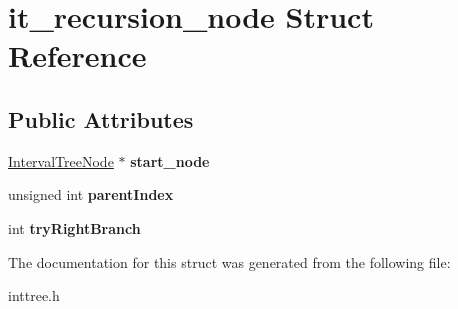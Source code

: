 \hypertarget{structit__recursion__node}{\section{it\-\_\-recursion\-\_\-node Struct Reference}
\label{structit__recursion__node}
}
\subsection*{Public Attributes}
\begin{DoxyCompactItemize}
\item 
\hypertarget{structit__recursion__node_a64a5868bd2326f89455ee3e54041bad5}{\hyperlink{struct_interval_tree_node}{Interval\-Tree\-Node} $\ast$ {\bfseries start\-\_\-node}}\label{structit__recursion__node_a64a5868bd2326f89455ee3e54041bad5}

\item 
\hypertarget{structit__recursion__node_abacce4eebfa375314c35624ec9172f5c}{unsigned int {\bfseries parent\-Index}}\label{structit__recursion__node_abacce4eebfa375314c35624ec9172f5c}

\item 
\hypertarget{structit__recursion__node_a09eb80717fadbe8fee9955625d47b522}{int {\bfseries try\-Right\-Branch}}\label{structit__recursion__node_a09eb80717fadbe8fee9955625d47b522}

\end{DoxyCompactItemize}


The documentation for this struct was generated from the following file\-:\begin{DoxyCompactItemize}
\item 
inttree.\-h\end{DoxyCompactItemize}
